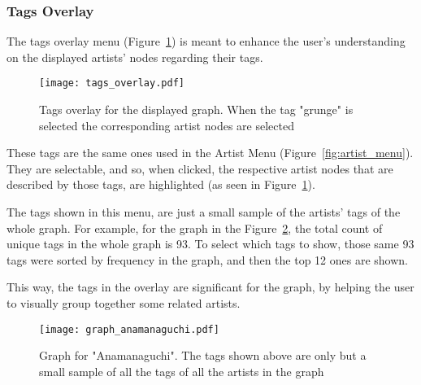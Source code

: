 
    \subsubsection{Tags Overlay} %
      \label{ssub:tags_overlay}

      The tags overlay menu (Figure~\ref{fig:tags_overlay}) is meant to enhance the user's understanding on the displayed artists' nodes regarding their tags.
      \begin{figure}[tb]
        \begin{center}
          \texttt{[image: tags\_overlay.pdf]}
        \end{center}
        \caption{Tags overlay for the displayed graph. When the tag "grunge" is selected the corresponding artist nodes are selected}
        \label{fig:tags_overlay}
      \end{figure}
      These tags are the same ones used in the Artist Menu (Figure~\ref{fig:artist_menu}).
      They are selectable, and so, when clicked, the respective artist nodes that are described by those tags, are highlighted (as seen in Figure~\ref{fig:tags_overlay}).

      The tags shown in this menu, are just a small sample of the artists' tags of the whole graph.
      For example, for the graph in the Figure~\ref{fig:graph_anamanaguchi}, the total count of unique tags in the whole graph is 93.
      To select which tags to show, those same 93 tags were sorted by frequency in the graph, and then the top 12 ones are shown.

      This way, the tags in the overlay are significant for the graph, by helping the user to visually group together some related artists.

      \begin{figure}
        \begin{center}
          \texttt{[image: graph\_anamanaguchi.pdf]}
        \end{center}
        \caption{Graph for "Anamanaguchi". The tags shown above are only but a small sample of all the tags of all the artists in the graph}
        \label{fig:graph_anamanaguchi}
      \end{figure}



  \clearpage



